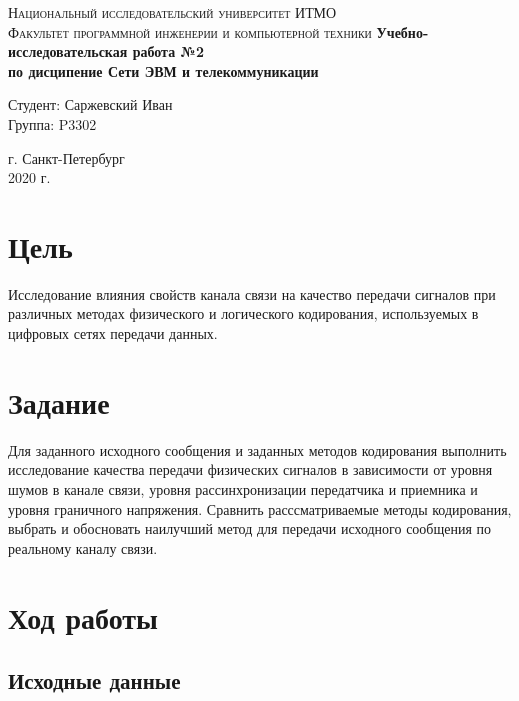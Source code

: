 \documentclass[12pt, a4paper]{article}
\begin{document}
\begin{titlepage}
\begin{center}

\textsc{Национальный исследовательский университет ИТМО\\[4mm]
Факультет программной инженерии и компьютерной техники}
\vfill
\textbf{Учебно-исследовательская работа №2\\[4mm]
по дисципение Сети ЭВМ и телекоммуникации\\[16mm]
}
\begin{flushright}
Студент: Саржевский Иван
\\[2mm]Группа: P3302
\end{flushright}
\vfill
г. Санкт-Петербург\\[2mm]
2020 г.

\end{center}
\end{titlepage}

\tableofcontents
\newpage

\justify

\section{Цель}

Исследование влияния свойств канала связи на качество передачи сигналов при
различных методах физического и логического кодирования, используемых в цифровых
сетях передачи данных.

\section{Задание}

Для заданного исходного сообщения и заданных методов кодирования выполнить
исследование качества передачи физических сигналов в зависимости от уровня
шумов в канале связи, уровня рассинхронизации передатчика и приемника и уровня
граничного напряжения. Сравнить расссматриваемые методы кодирования, выбрать и
обосновать наилучший метод для передачи исходного сообщения по реальному каналу
связи.

\section{Ход работы}

\subsection{Исходные данные}
\end{document}
